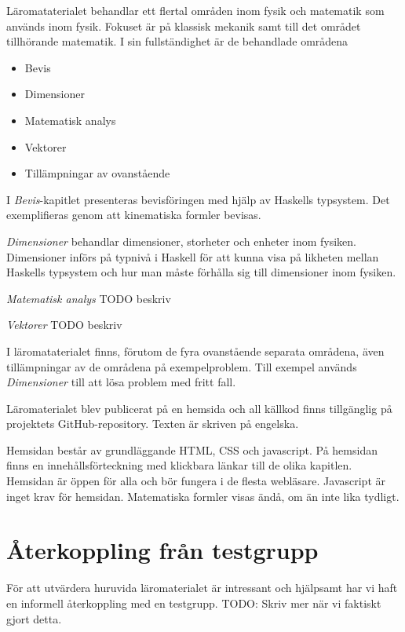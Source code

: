 \begin{binge}
Läromataterialet behandlar ett flertal områden inom fysik och matematik som används inom fysik. Fokuset är på klassisk mekanik samt till det området tillhörande matematik. I sin fullständighet är de behandlade områdena

\begin{itemize}
  \item Bevis
  \item Dimensioner
  \item Matematisk analys
  \item Vektorer
  \item Tillämpningar av ovanstående
\end{itemize}

I \textit{Bevis}-kapitlet presenteras bevisföringen med hjälp av Haskells typsystem. Det exemplifieras genom att kinematiska formler bevisas.

\textit{Dimensioner} behandlar dimensioner, storheter och enheter inom fysiken. Dimensioner införs på typnivå i Haskell för att kunna visa på likheten mellan Haskells typsystem och hur man måste förhålla sig till dimensioner inom fysiken.

\textit{Matematisk analys} TODO beskriv

\textit{Vektorer} TODO beskriv

I läromataterialet finns, förutom de fyra ovanstående separata områdena, även tillämpningar av de områdena på exempelproblem. Till exempel används \textit{Dimensioner} till att lösa problem med fritt fall.

Läromaterialet blev publicerat på en hemsida\cite{LYAP} och all källkod finns tillgänglig på projektets GitHub-repository.\cite{LYAP_repo} Texten är skriven på engelska.

Hemsidan består av grundläggande HTML, CSS och javascript. På hemsidan finns en innehållsförteckning med klickbara länkar till de olika kapitlen. Hemsidan är öppen för alla och bör fungera i de flesta webläsare. Javascript är inget krav för hemsidan. Matematiska formler visas ändå, om än inte lika tydligt.

\section{Återkoppling från testgrupp}

För att utvärdera huruvida läromaterialet är intressant och hjälpsamt har vi
haft en informell återkoppling med en testgrupp. TODO: Skriv mer när vi
faktiskt gjort detta.

\end{binge}
